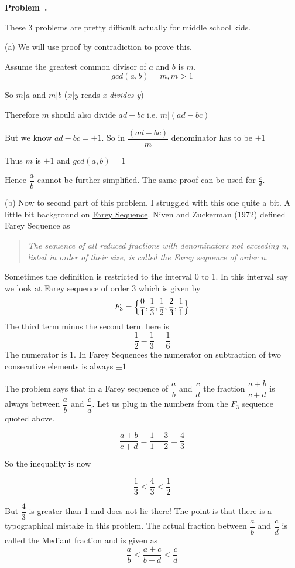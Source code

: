 \documentclass[10pt]{article}
\newcounter{problem}
\newenvironment{problem}[1][]{
  \refstepcounter{problem}
  \par\noindent\textbf{Problem~\theproblem. #1}\par
  \vspace{0.5em}
}{\vspace{1em}}
\begin{document}
\begin{problem} %
These 3 problems are pretty difficult actually for middle school kids.

(a) We will use proof by contradiction to prove this.

Assume the greatest common divisor of $a$ and $b$ is $m$.
\[
gcd(a,b) = m, m>1
\]

So $m | a$ and $m | b$ ($x|y$ reads \textit{x divides y})

Therefore $m$ should also divide $ad - bc$ i.e. $m|(ad -bc)$

But we know $ad - bc = \pm 1$. So in $\dfrac{(ad - bc)}{m}$ denominator has to be $+1$

Thus $m$ is $+1$ and $gcd(a,b) = 1$

Hence $\dfrac{a}{b}$ cannot be further simplified. The same proof can be used for $\frac{c}{d}$.

(b) Now to second part of this problem. I struggled with this one quite a bit. A little bit
background on \href{https://en.wikipedia.org/wiki/Farey_sequence}{Farey Sequence}. Niven and Zuckerman (1972)
defined Farey Sequence as
\begin{quotation}
  \textit{The sequence of all reduced fractions with denominators not exceeding n, listed in order of their size, is called the Farey sequence of order n.}
\end{quotation}
Sometimes the definition is restricted to the interval 0 to 1. In this interval say we look at
Farey sequence of order  3 which is given by 
\[
F_3 = \Bigl\{ \frac{0}{1}, \frac{1}{3}, \frac{1}{2}, \frac{2}{3}, \frac{1}{1} \Bigl\}
\]
The third term minus the second term here is
\[
\frac{1}{2} - \frac{1}{3} = \frac{1}{6}
\]
The numerator is 1. In Farey Sequences the numerator on subtraction of two consecutive elements is always $\pm1$

The problem says that in a Farey sequence of $\dfrac{a}{b}$ and $\dfrac{c}{d}$ the fraction $\dfrac{a+b}{c+d}$ is always between
$\dfrac{a}{b}$ and $\dfrac{c}{d}$. Let us plug in the numbers from the $F_3$ sequence quoted above.

\[
\frac{a+b}{c+d} = \frac{1 + 3}{1 + 2} = \frac{4}{3}
\]

So the inequality is now

\[
\frac{1}{3} < \frac{4}{3} < \frac{1}{2}
\]

But $\dfrac{4}{3}$ is greater than 1 and does not lie there! The point is that there is a typographical mistake in this problem.
The actual fraction between $\dfrac{a}{b}$ and $\dfrac{c}{d}$ is called the Mediant fraction and is given as
\[
\frac{a}{b} < \frac{a + c}{b + d}<\frac{c}{d}
\]


\end{problem}
\end{document}
